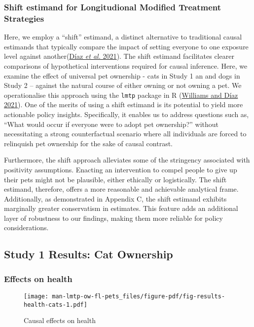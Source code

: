 \documentclass[
  singlecolumn,
  9pt]{article}
\begin{document}
\subsubsection{Shift estimand for Longitudional Modified Treatment
Strategies}\label{shift-estimand-for-longitudional-modified-treatment-strategies}

Here, we employ a ``shift'' estimand, a distinct alternative to
traditional causal estimands that typically compare the impact of
setting everyone to one exposure level against
another(\hyperref[ref-duxedaz2021]{Díaz \emph{et al.} 2021}). The shift
estimand facilitates clearer comparisons of hypothetical interventions
required for causal inference. Here, we examine the effect of universal
pet ownership - cats in Study 1 an and dogs in Study 2 -- against the
natural course of either owning or not owning a pet. We operationalise
this approach using the \texttt{lmtp} package in R
(\hyperref[ref-williams2021]{Williams and Díaz 2021}). One of the merits
of using a shift estimand is its potential to yield more actionable
policy insights. Specifically, it enables us to address questions such
as, ``What would occur if everyone were to adopt pet ownership?''
without necessitating a strong counterfactual scenario where all
individuals are forced to relinquish pet ownership for the sake of
causal contrast.

Furthermore, the shift approach alleviates some of the stringency
associated with positivity assumptions. Enacting an intervention to
compel people to give up their pets might not be plausible, either
ethically or logistically. The shift estimand, therefore, offers a more
reasonable and achievable analytical frame. Additionally, as
demonstrated in Appendix C, the shift estimand exhibits marginally
greater conservatism in estimates. This feature adds an additional layer
of robustness to our findings, making them more reliable for policy
considerations.

\newpage{}

\subsection{Study 1 Results: Cat
Ownership}\label{study-1-results-cat-ownership}

\subsubsection{Effects on health}\label{effects-on-health}

\begin{figure}

{\centering \texttt{[image: man-lmtp-ow-fl-pets\_files/figure-pdf/fig-results-health-cats-1.pdf]}

}

\caption{\label{fig-results-health-cats}Causal effects on health}

\end{figure}
\end{document}
